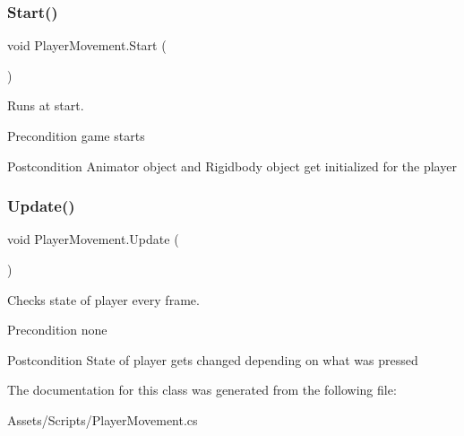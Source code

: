 \subsubsection{\texorpdfstring{Start()}{Start()}}
{\footnotesize\ttfamily void Player\+Movement.\+Start (\begin{DoxyParamCaption}{ }\end{DoxyParamCaption})\hspace{0.3cm}{\ttfamily [inline]}}

Runs at start. \begin{DoxyPrecond}{Precondition}
game starts 
\end{DoxyPrecond}
\begin{DoxyPostcond}{Postcondition}
Animator object and Rigidbody object get initialized for the player 
\end{DoxyPostcond}
\mbox{\label{class_player_movement_aaf9b77d7177d538be9c1447d08191322}} 
\subsubsection{\texorpdfstring{Update()}{Update()}}
{\footnotesize\ttfamily void Player\+Movement.\+Update (\begin{DoxyParamCaption}{ }\end{DoxyParamCaption})\hspace{0.3cm}{\ttfamily [inline]}}

Checks state of player every frame. \begin{DoxyPrecond}{Precondition}
none 
\end{DoxyPrecond}
\begin{DoxyPostcond}{Postcondition}
State of player gets changed depending on what was pressed 
\end{DoxyPostcond}


The documentation for this class was generated from the following file\+:\begin{DoxyCompactItemize}
\item 
Assets/\+Scripts/Player\+Movement.\+cs\end{DoxyCompactItemize}
